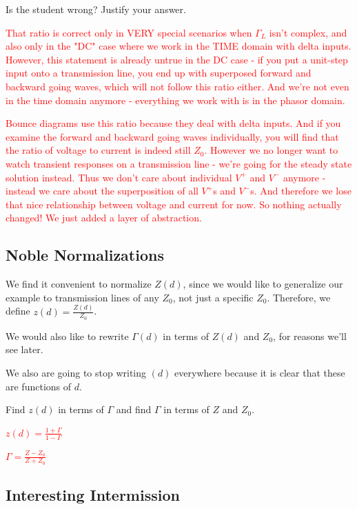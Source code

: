 \documentclass{article}
\begin{document}
Is the student wrong? Justify your answer.

\textcolor{red}{That ratio is correct only in VERY special scenarios when $\Gamma_L$ isn't complex, and also only in the "DC" case where we work in the TIME domain with delta inputs. However, this statement is already untrue in the DC case - if you put a unit-step input onto a transmission line, you end up with superposed forward and backward going waves, which will not follow this ratio either. And we're not even in the time domain anymore - everything we work with is in the phasor domain.}

\textcolor{red}{Bounce diagrams use this ratio because they deal with delta inputs. And if you examine the forward and backward going waves individually, you will find that the ratio of voltage to current is indeed still $Z_0$. However we no longer want to watch transient responses on a transmission line - we're going for the steady state solution instead. Thus we don't care about individual $V^+$ and $V^-$ anymore - instead we care about the superposition of all $V^+$s and $V^-$s. And therefore we lose that nice relationship between voltage and current for now. So nothing actually changed! We just added a layer of abstraction.}

\vfill

\subsection{Noble Normalizations}

We find it convenient to normalize $Z(d)$, since we would like to generalize our example to transmission lines of any $Z_0$, not just a specific $Z_0$. Therefore, we define $z(d) = \frac{Z(d)}{Z_0}$.

We would also like to rewrite $\Gamma(d)$ in terms of $Z(d)$ and $Z_0$, for reasons we'll see later.

We also are going to stop writing $(d)$ everywhere because it is clear that these are functions of $d$.

Find $z(d)$ in terms of $\Gamma$ and find $\Gamma$ in terms of $Z$ and $Z_0$.

\textcolor{red}{$z(d) = \frac{1 + \Gamma}{1 - \Gamma}$}

\textcolor{red}{$\Gamma = \frac{Z - Z_0}{Z + Z_0}$}

\vfill

\subsection{Interesting Intermission}
\end{document}

